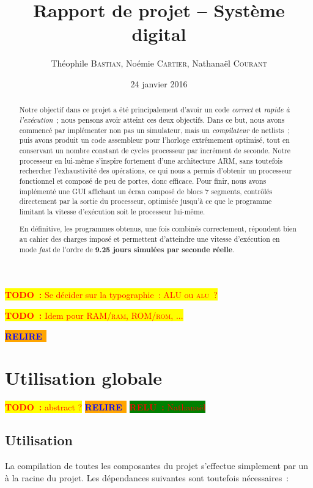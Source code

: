 \documentclass[11pt,a4paper]{article}
\author{Théophile \textsc{Bastian}, Noémie \textsc{Cartier}, Nathanaël \textsc{Courant}}
\title{Rapport de projet -- Système digital}
\date{24 janvier 2016} %
\newcommand{\htodo}[1]{\begin{huge}\colorbox{yellow}{\textcolor{red}{\textbf{TODO~:} #1}}\end{huge}}
\newcommand{\todo}[1]{\colorbox{yellow}{\textcolor{red}{\textbf{TODO~:} #1}}}
\newcommand{\relire}{\colorbox{orange}{\textcolor{blue}{\textbf{RELIRE}~}}}
\newcommand{\relu}[1]{\colorbox{green}{\textcolor{red}{\textbf{RELU~:} #1}}}
\begin{document}
\maketitle

\htodo{Se décider sur la typographie~: ALU ou \textsc{alu}~?}

\todo{Idem pour RAM/\textsc{ram}, ROM/\textsc{rom}, ...}

\relire
\begin{abstract}
Notre objectif dans ce projet a été principalement d'avoir un code \emph{correct} et \emph{rapide à l'exécution}~; nous pensons avoir atteint ces deux objectifs. Dans ce but, nous avons commencé par implémenter non pas un simulateur, mais un \emph{compilateur} de netlists~; puis avons produit un code assembleur pour l'horloge extrêmement optimisé, tout en conservant un nombre constant de cycles processeur par incrément de seconde. Notre processeur en lui-même s'inspire fortement d'une architecture ARM, sans toutefois rechercher l'exhaustivité des opérations, ce qui nous a permis d'obtenir un processeur fonctionnel et composé de peu de portes, donc efficace. Pour finir, nous avons implémenté une GUI affichant un écran composé de blocs 7 segments, contrôlés directement par la sortie du processeur, optimisée jusqu'à ce que le programme limitant la vitesse d'exécution soit le processeur lui-même.

En définitive, les programmes obtenus, une fois combinés correctement, répondent bien au cahier des charges imposé et permettent d'atteindre une vitesse d'exécution en mode \textit{fast} de l'ordre de \textbf{9.25 jours simulées par seconde réelle}.
\end{abstract}

\setcounter{tocdepth}{2} %
\tableofcontents
\pagebreak


\section{Utilisation globale}

\todo{abstract ?}
\relire
\relu{Nathanaël}

\subsection{Utilisation}

La compilation de toutes les composantes du projet s'effectue simplement par un  à la racine du projet. Les dépendances suivantes sont toutefois nécessaires~:
\end{document}
